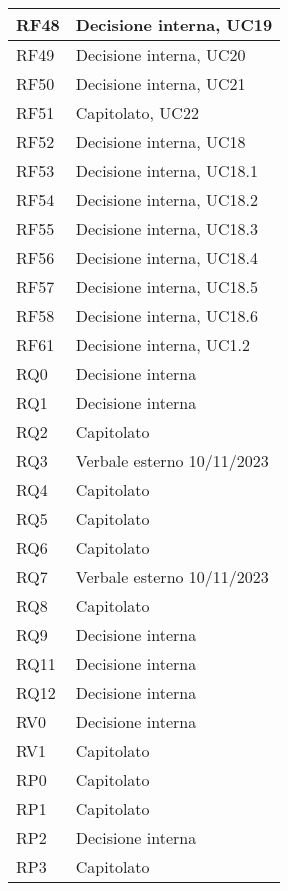 \begin{center}
\begin{longtable}{|C{5cm}|C{5cm}|}
        \hline
        RF48 & Decisione interna, UC19 \\
        \hline
        RF49 & Decisione interna, UC20 \\
        \hline
        RF50 & Decisione interna, UC21 \\
        \hline
        RF51 & Capitolato, UC22 \\
        \hline
        RF52 & Decisione interna, UC18 \\
        \hline
        RF53 & Decisione interna, UC18.1 \\
        \hline
        RF54 & Decisione interna, UC18.2 \\
        \hline
        RF55 & Decisione interna, UC18.3 \\
        \hline
        RF56 & Decisione interna, UC18.4 \\
        \hline
        RF57 & Decisione interna, UC18.5 \\
        \hline
        RF58 & Decisione interna, UC18.6 \\
        \hline
        RF61 & Decisione interna, UC1.2 \\
        \hline
        RQ0 & Decisione interna \\
        \hline
        RQ1 & Decisione interna \\
        \hline
        RQ2 & Capitolato \\
        \hline
        RQ3 & Verbale esterno 10/11/2023 \\
        \hline
        RQ4 & Capitolato \\
        \hline
        RQ5 & Capitolato \\
        \hline
        RQ6 & Capitolato \\
        \hline
        RQ7 & Verbale esterno 10/11/2023 \\
        \hline
        RQ8 & Capitolato \\
        \hline
        RQ9 &  Decisione interna \\
        \hline
        RQ11 & Decisione interna \\
        \hline
        RQ12 & Decisione interna \\
        \hline
        RV0 & Decisione interna \\
        \hline
        RV1 & Capitolato \\
        \hline
        RP0 & Capitolato \\
        \hline
        RP1 & Capitolato \\
        \hline
        RP2 & Decisione interna \\
        \hline
        RP3 & Capitolato \\
        \hline
    \end{longtable}
\end{center}


